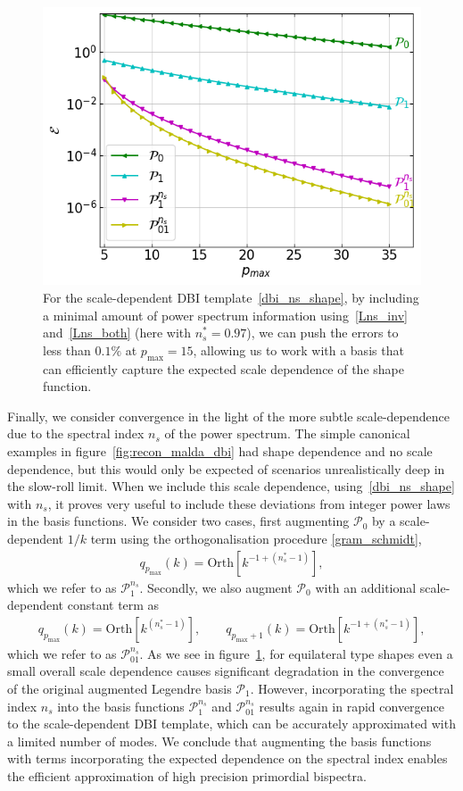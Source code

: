 \documentclass[a4paper,12pt]{extarticle}
\newcommand{\Pmax}{p_\text{max}}
\newcommand{\Lbasic}{\mathcal{P}_0}
\newcommand{\Linvk}{\mathcal{P}_1}
\newcommand{\Lnsinv}{\mathcal{P}^{n_s}_1}
\newcommand{\Lnsboth}{\mathcal{P}^{n_s}_{01}}
\begin{document}
\begin{figure}[!pth]
\centering
\includegraphics[width=0.8\columnwidth]{plots/template_reconstruction_DBI_ns.png}
\caption{
    For the scale-dependent DBI template~\eqref{dbi_ns_shape},
    by including a minimal amount of power spectrum information
    using~\eqref{Lns_inv} and~\eqref{Lns_both} (here with
    $n_s^{*}=0.97$), we can push the errors
    to less than $0.1\%$ at $\Pmax=15$,
    allowing us to work with a basis that can efficiently
    capture the expected scale dependence of the shape function.
    }\label{fig:recon_dbi_ns}
\end{figure}

Finally, we consider convergence in the light of the more subtle scale-dependence due to the spectral index $n_s$ of the power spectrum.  The simple canonical examples in figure~\ref{fig:recon_malda_dbi} had shape dependence and no scale dependence, but this would only be expected of scenarios unrealistically deep in the slow-roll limit.
When we include this scale dependence, using~\eqref{dbi_ns_shape} with $n_s$, 
it proves very useful to include these deviations from
integer power laws in the basis functions.  We consider two cases, first augmenting $\Lbasic$ by a scale-dependent $1/k$ term using the orthogonalisation procedure \eqref{gram_schmidt}, 
\begin{align}\label{Lns_inv}
    q_{\Pmax}(k) = \text{Orth}\left[{k^{-1+(n_s^{*}-1)}}\right],
\end{align}
which we refer to as $\Lnsinv$.
Secondly, we also augment $\Lbasic$ with an additional scale-dependent constant term as 
\begin{align}\label{Lns_both}
    q_{\Pmax}(k) = \text{Orth}\left[{k^{(n_s^{*}-1)}}\right],\qquad  q_{\Pmax\text{$+$}1}(k) = \text{Orth}\left[{k^{-1+(n_s^{*}-1)}}\right],
\end{align}
which we refer to as $\Lnsboth$.
As we see in figure~\ref{fig:recon_dbi_ns}, for equilateral type shapes
even a small overall scale dependence causes significant degradation in the convergence of the original augmented Legendre basis $\Linvk$.  However, incorporating the spectral index $n_s$  into the basis functions $\Lnsinv$ and $\Lnsboth$ results again in rapid convergence to the scale-dependent DBI template, which can be accurately approximated with a limited number of modes.    We conclude that augmenting the basis functions with terms incorporating the expected dependence on the spectral index enables the efficient approximation of high precision primordial bispectra. 
\end{document}
